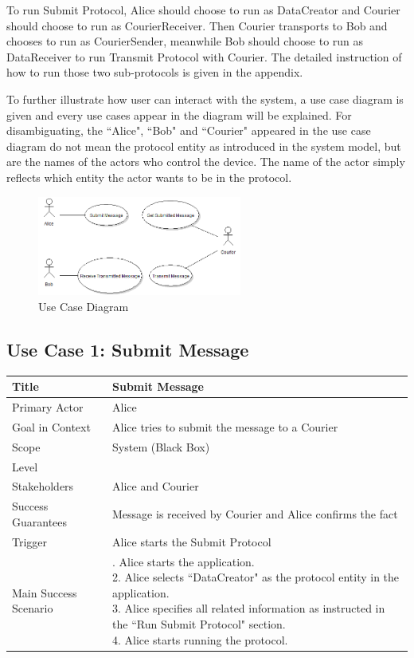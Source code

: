 To run Submit Protocol, Alice should choose to run as DataCreator and Courier should choose to run as CourierReceiver. Then Courier transports to Bob and chooses to run as CourierSender, meanwhile Bob should choose to run as DataReceiver to run Transmit Protocol with Courier. The detailed instruction of how to run those two sub-protocols is given in the appendix. \par

To further illustrate how user can interact with the system, a use case diagram is given and every use cases appear in the diagram will be explained. For disambiguating, the ``Alice", ``Bob" and ``Courier" appeared in the use case diagram do not mean the protocol entity as introduced in the system model, but are the names of the actors who control the device. The name of the actor simply reflects which entity the actor wants to be in the protocol. \\

\begin{figure}[h!]
\centering
\includegraphics[width=0.6\textwidth,natwidth=565,natheight=275]{figures/usecasediagram.png}
\caption{Use Case Diagram}
\end{figure}

\subsection*{Use Case 1: Submit Message}
\begin{tabular}{|l|p{}|}
 \hline
 Title & Submit Message \\ \hline
 Primary Actor & Alice \\ \hline
 Goal in Context & Alice tries to submit the message to a Courier \\ \hline
 Scope & System (Black Box) \\ \hline
 Level & \\ \hline
 Stakeholders & Alice and Courier \\ \hline
 Success Guarantees & Message is received by Courier and Alice confirms the fact \\ \hline
 Trigger & Alice starts the Submit Protocol \\ \hline
 Main Success Scenario & 
 \parbox{9cm}{
  . Alice starts the application. \\
  2. Alice selects ``DataCreator" as the protocol entity in the application. \\
  3. Alice specifies all related information as instructed in the ``Run Submit Protocol" section. \\
  4. Alice starts running the protocol.
  \medskip
 }
 \\ \hline
\end{tabular}
\\
\\
